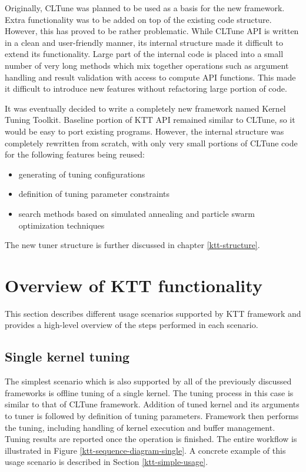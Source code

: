 \documentclass
[
    digital, %
    oneside, %
    table, %
    nolof, %
    nolot, %
    nocover %
]{fithesis3}
\begin{document}
Originally, CLTune was planned to be used as a basis for the new framework. Extra functionality was to be added on top of the existing code structure.
However, this has proved to be rather problematic. While CLTune API is written in a clean and user-friendly manner, its internal structure made it
difficult to extend its functionality. Large part of the internal code is placed into a small number of very long methods which mix together operations
such as argument handling and result validation with access to compute API functions. This made it difficult to introduce new features without refactoring
large portion of code.

It was eventually decided to write a completely new framework named Kernel Tuning Toolkit. Baseline portion of KTT API remained similar to CLTune,
so it would be easy to port existing programs. However, the internal structure was completely rewritten from scratch, with only very small portions
of CLTune code for the following features being reused:
\begin{itemize}
    \item generating of tuning configurations
    \item definition of tuning parameter constraints
    \item search methods based on simulated annealing and particle swarm optimization techniques
\end{itemize}
The new tuner structure is further discussed in chapter \ref{ktt-structure}.

\section{Overview of KTT functionality}
This section describes different usage scenarios supported by KTT framework and provides a high-level overview of the steps performed in each scenario.

\subsection{Single kernel tuning}
The simplest scenario which is also supported by all of the previously discussed frameworks is offline tuning of a single kernel. The tuning process in
this case is similar to that of CLTune framework. Addition of tuned kernel and its arguments to tuner is followed by definition of tuning parameters.
Framework then performs the tuning, including handling of kernel execution and buffer management. Tuning results are reported once the operation is
finished. The entire workflow is illustrated in Figure \ref{ktt-sequence-diagram-single}. A concrete example of this usage scenario is described in
Section \ref{ktt-simple-usage}.
\end{document}
